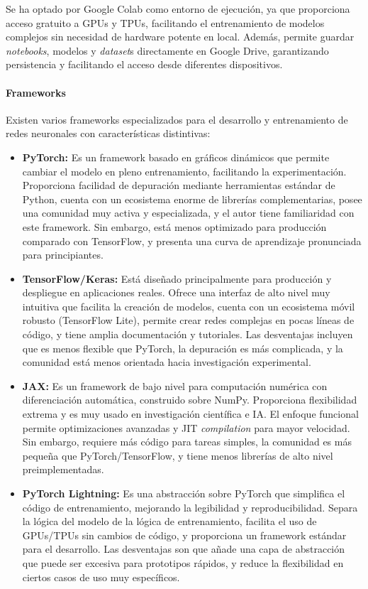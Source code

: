 \normalsize

Se ha optado por Google Colab como entorno de ejecución, ya que proporciona acceso gratuito a GPUs y TPUs, facilitando el entrenamiento de modelos complejos sin necesidad de hardware potente en local. Además, permite guardar \textit{notebooks}, modelos y \textit{dataset}s directamente en Google Drive, garantizando persistencia y facilitando el acceso desde diferentes dispositivos.

\paragraph{Frameworks}

Existen varios frameworks especializados para el desarrollo y entrenamiento de redes neuronales con características distintivas:

\begin{itemize}
    \item \textbf{PyTorch:} Es un framework basado en gráficos dinámicos que permite cambiar el modelo en pleno entrenamiento, facilitando la experimentación. Proporciona facilidad de depuración mediante herramientas estándar de Python, cuenta con un ecosistema enorme de librerías complementarias, posee una comunidad muy activa y especializada, y el autor tiene familiaridad con este framework. Sin embargo, está menos optimizado para producción comparado con TensorFlow, y presenta una curva de aprendizaje pronunciada para principiantes.
    
    \item \textbf{TensorFlow/Keras:} Está diseñado principalmente para producción y despliegue en aplicaciones reales. Ofrece una interfaz de alto nivel muy intuitiva que facilita la creación de modelos, cuenta con un ecosistema móvil robusto (TensorFlow Lite), permite crear redes complejas en pocas líneas de código, y tiene amplia documentación y tutoriales. Las desventajas incluyen que es menos flexible que PyTorch, la depuración es más complicada, y la comunidad está menos orientada hacia investigación experimental.
    
    \item \textbf{JAX:} Es un framework de bajo nivel para computación numérica con diferenciación automática, construido sobre NumPy. Proporciona flexibilidad extrema y es muy usado en investigación científica e IA\@. El enfoque funcional permite optimizaciones avanzadas y JIT \textit{compilation} para mayor velocidad. Sin embargo, requiere más código para tareas simples, la comunidad es más pequeña que PyTorch/TensorFlow, y tiene menos librerías de alto nivel preimplementadas.
    
    \item \textbf{PyTorch Lightning:} Es una abstracción sobre PyTorch que simplifica el código de entrenamiento, mejorando la legibilidad y reproducibilidad. Separa la lógica del modelo de la lógica de entrenamiento, facilita el uso de GPUs/TPUs sin cambios de código, y proporciona un framework estándar para el desarrollo. Las desventajas son que añade una capa de abstracción que puede ser excesiva para prototipos rápidos, y reduce la flexibilidad en ciertos casos de uso muy específicos.
\end{itemize}

